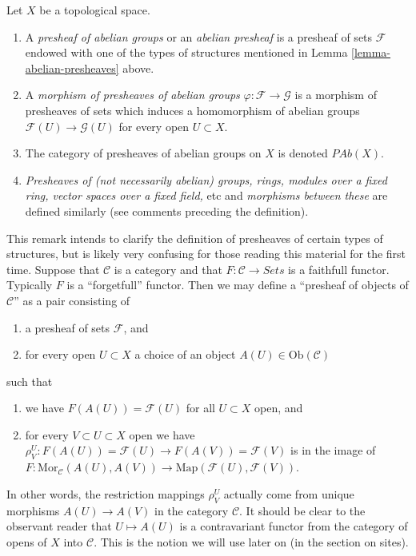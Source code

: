 \begin{definition}
\label{definition-abelian-presheaves}
Let $X$ be a topological space.
\begin{enumerate}
\item A {\it presheaf of abelian groups} or an {\it abelian presheaf}
is a presheaf of sets $\mathcal{F}$ endowed with one of the types
of structures mentioned in Lemma \ref{lemma-abelian-presheaves} above.
\item A {\it morphism of presheaves of abelian groups}
$\varphi : \mathcal{F} \to \mathcal{G}$ is a morphism of presheaves
of sets which induces
a homomorphism of abelian groups $\mathcal{F}(U) \to \mathcal{G}(U)$
for every open $U \subset X$.
\item The category of presheaves of abelian groups on $X$ is denoted
$\textit{PAb}(X)$.
\item {\it Presheaves of (not necessarily abelian) groups, rings, modules
over a fixed ring, vector spaces over a fixed field,} etc and
{\it morphisms between these} are defined similarly (see comments
preceding the definition).
\end{enumerate}
\end{definition}

\begin{remark}
\label{remark-presheaves-structure}
This remark intends to clarify the definition
of presheaves of certain types of structures,
but is likely very confusing for those reading
this material for the first time.
Suppose that $\mathcal{C}$ is a category and
that $F : \mathcal{C} \to \textit{Sets}$ is
a faithfull functor. Typically $F$ is a ``forgetfull''
functor. Then we may define a ``presheaf of objects of $\mathcal{C}$''
as a pair consisting of
\begin{enumerate}
\item a presheaf of sets $\mathcal{F}$, and
\item for every open $U \subset X$ a choice
of an object $A(U) \in \text{Ob}(\mathcal{C})$
\end{enumerate}
such that
\begin{enumerate}
\item we have $F(A(U)) = \mathcal{F}(U)$ for all $U \subset X$ open, and
\item for every $V \subset U \subset X$ open we have
$\rho^U_V : F(A(U)) = \mathcal{F}(U) \to F(A(V)) = \mathcal{F}(V)$
is in the image of $F : \text{Mor}_{\mathcal{C}}(A(U), A(V))
\to \text{Map}(\mathcal{F}(U), \mathcal{F}(V))$.
\end{enumerate}
In other words, the restriction mappings $\rho^U_V$ actually
come from unique morphisms $A(U) \to A(V)$ in the category $\mathcal{C}$.
It should be clear to the observant reader that $U \mapsto A(U)$
is a contravariant functor from the category of opens of $X$
into $\mathcal{C}$. This is the notion we will use later on
(in the section on sites).
\end{remark}

